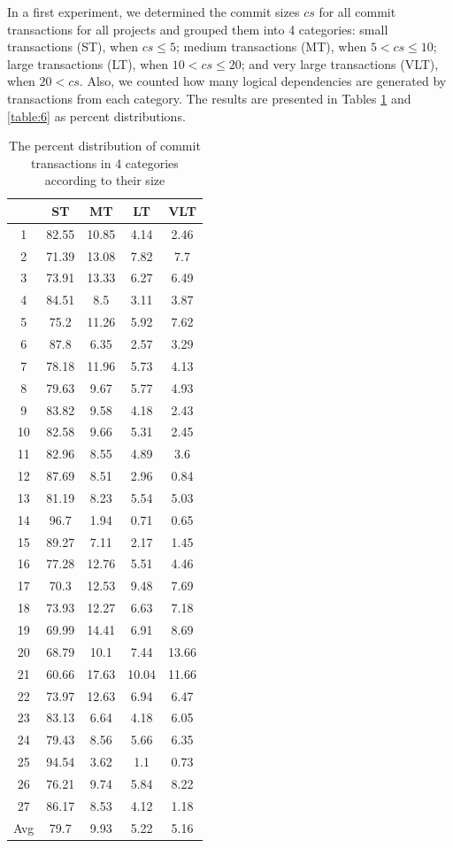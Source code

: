 \documentclass[a4paper,twoside]{article}
\begin{document}
In a first experiment, we determined the commit sizes $cs$ for all commit transactions for all projects and grouped them into 4 categories: small transactions (ST), when 	$cs\leq 5$; medium transactions (MT), when 	$5 < cs\leq 10$; large transactions (LT), when 	$10 < cs\leq 20$; and very large transactions (VLT), when 	$20 < cs$. Also, we counted how many logical dependencies are generated by transactions  from each category. The results are presented in Tables \ref{table:5} and \ref{table:6} as percent distributions.


\begin{table}[!h]
\renewcommand{\arraystretch}{1.1}
\caption{The percent distribution of commit transactions in 4 categories according to their size}


\label{table:5}
\centering
\begin{tabular}{|c|c|c|c|c|}
\hline
   &	ST	&	 MT	&	LT	&	VLT	\\
\hline
1	&	82.55	&	10.85	&	4.14	&	2.46	\\
2	&	71.39	&	13.08	&	7.82	&	7.7	\\
3	&	73.91	&	13.33	&	6.27	&	6.49	\\
4	&	84.51	&	8.5	&	3.11	&	3.87	\\
5	&	75.2	&	11.26	&	5.92	&	7.62	\\
6	&	87.8	&	6.35	&	2.57	&	3.29	\\
7	&	78.18	&	11.96	&	5.73	&	4.13	\\
8	&	79.63	&	9.67	&	5.77	&	4.93	\\
9	&	83.82	&	9.58	&	4.18	&	2.43	\\
10	&	82.58	&	9.66	&	5.31	&	2.45	\\
11	&	82.96	&	8.55	&	4.89	&	3.6	\\
12	&	87.69	&	8.51	&	2.96	&	0.84	\\
13	&	81.19	&	8.23	&	5.54	&	5.03	\\
14	&	96.7	&	1.94	&	0.71	&	0.65	\\
15	&	89.27	&	7.11	&	2.17	&	1.45	\\
16	&	77.28	&	12.76	&	5.51	&	4.46	\\
17	&	70.3	&	12.53	&	9.48	&	7.69	\\
18	&	73.93	&	12.27	&	6.63	&	7.18	\\
19	&	69.99	&	14.41	&	6.91	&	8.69	\\
20	&	68.79	&	10.1	&	7.44	&	13.66	\\
21	&	60.66	&	17.63	&	10.04	&	11.66	\\
22	&	73.97	&	12.63	&	6.94	&	6.47	\\
23	&	83.13	&	6.64	&	4.18	&	6.05	\\
24	&	79.43	&	8.56	&	5.66	&	6.35	\\
25	&	94.54	&	3.62	&	1.1	&	0.73	\\
26	&	76.21	&	9.74	&	5.84	&	8.22	\\
27	&	86.17	&	8.53	&	4.12	&	1.18	\\
\hline
Avg	&	79.7	&	9.93	&	5.22	&	5.16	\\
\hline
\end{tabular}
\end{table}
\end{document}

